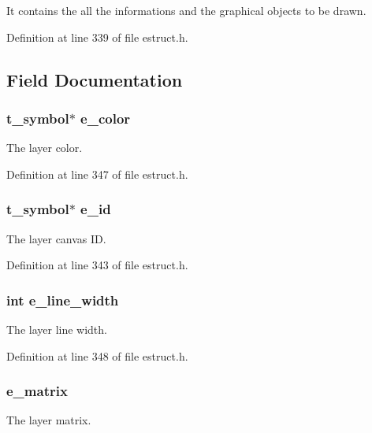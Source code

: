 It contains the all the informations and the graphical objects to be drawn. 

Definition at line 339 of file estruct.\-h.



\subsection{Field Documentation}
\hypertarget{struct__elayer_a13dfb00aea95e0dc5b9d1297260a9280}{
\subsubsection[{e\-\_\-color}]{\setlength{\rightskip}{0pt plus 5cm}t\-\_\-symbol$\ast$ e\-\_\-color}}\label{struct__elayer_a13dfb00aea95e0dc5b9d1297260a9280}
The layer color. 

Definition at line 347 of file estruct.\-h.

\hypertarget{struct__elayer_a1f5d3d53b83fa9009ede11f8a9902dff}{
\subsubsection[{e\-\_\-id}]{\setlength{\rightskip}{0pt plus 5cm}t\-\_\-symbol$\ast$ e\-\_\-id}}\label{struct__elayer_a1f5d3d53b83fa9009ede11f8a9902dff}
The layer canvas I\-D. 

Definition at line 343 of file estruct.\-h.

\hypertarget{struct__elayer_a4f088d61988de49543e814d4b5a74947}{
\subsubsection[{e\-\_\-line\-\_\-width}]{\setlength{\rightskip}{0pt plus 5cm}int e\-\_\-line\-\_\-width}}\label{struct__elayer_a4f088d61988de49543e814d4b5a74947}
The layer line width. 

Definition at line 348 of file estruct.\-h.

\hypertarget{struct__elayer_a62d53e14693deed3469c69dc3a857493}{
\subsubsection[{e\-\_\-matrix}]{ e\-\_\-matrix}}\label{struct__elayer_a62d53e14693deed3469c69dc3a857493}
The layer matrix. 


